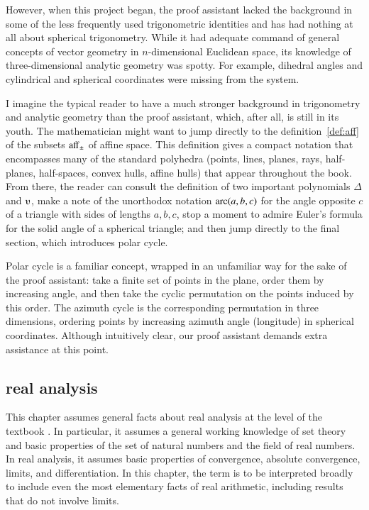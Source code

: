 However, when this project began, the proof assistant lacked the
background in some of the less frequently used trigonometric
identities and has had nothing at all about spherical trigonometry.
While it had adequate command of general concepts of vector geometry
in $n$-dimensional Euclidean space, its knowledge of three-dimensional
analytic geometry was spotty.  For example, dihedral angles and
cylindrical and spherical coordinates were missing from the system.

I imagine the typical reader to have a much stronger background in
trigonometry and analytic geometry than the proof assistant, which,
after all, is still in its youth.  The mathematician might want to
jump directly to the definition~\ref{def:aff} of the subsets
${\operatorname{aff}}_\pm$ of affine space.  This definition gives a compact
notation that encompasses many of the standard polyhedra (points,
lines, planes, rays, half-planes, half-spaces, convex hulls, affine
hulls) that appear throughout the book.  From there, the reader can
consult the definition of two important polynomials $\Delta$ and
$\ups$, make a note of the unorthodox notation $\operatorname{arc}(a,b,c)$ for the
angle opposite $c$ of a triangle with sides of lengths $a,b,c$, stop a
moment to admire Euler's formula for the solid angle of a spherical
triangle; and then jump directly to the final section, which
introduces polar cycle.

Polar cycle is a familiar concept, wrapped in an unfamiliar way
for the sake of the proof assistant: take a finite set of points in
the plane, order them by increasing angle, and then take the cyclic
permutation on the points induced by this order.  The azimuth cycle
is the corresponding permutation in three dimensions, ordering points by
increasing azimuth angle (longitude) in spherical coordinates.
Although intuitively clear, our proof assistant demands extra
assistance at this point.



\subsection{real analysis}
\label{back:analysis}  
  This chapter assumes general facts about
  \hypertarget{back:analysis}{real analysis} at the level of the
  textbook \cite{unknown}. 
  In particular, it assumes a general working knowledge of set theory 
and basic properties of the set of natural numbers and the
  field of real numbers.  In real analysis, it assumes basic
  properties of convergence, absolute convergence, limits, and
  differentiation.  In this chapter, the term  is
  to be interpreted broadly to include even the most elementary facts
  of real arithmetic, including results that
  do not involve limits.


